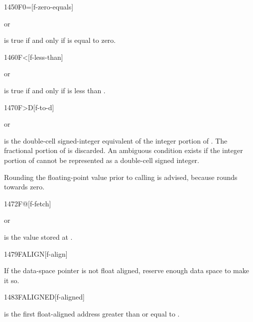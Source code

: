 \begin{worddef}{1450}{F0=}[f-zero-equals]
\item {}  or

	 is true if and only if  is equal to
	zero.
\end{worddef}


\begin{worddef}[Fless]{1460}{F<}[f-less-than]
\item {}  or

	 is true if and only if  is less than
	.
\end{worddef}


\begin{worddef}[FtoD]{1470}{F>D}[f-to-d]
\item {}  or

	 is the double-cell signed-integer equivalent of the
	integer portion of . The fractional portion of 
	is discarded. An ambiguous condition exists if the integer portion
	of  cannot be represented as a double-cell
	signed integer.

\note Rounding the floating-point value prior to calling 
	is advised, because  rounds towards zero.
\end{worddef}


\begin{worddef}{1472}{F@}[f-fetch]
\item {}  or

	 is the value stored at .
\end{worddef}


\begin{worddef}{1479}{FALIGN}[f-align]
\item \stack{}{}

	If the data-space pointer is not float aligned, reserve enough
	data space to make it so.
\end{worddef}


\begin{worddef}{1483}{FALIGNED}[f-aligned]
\item {}

	 is the first float-aligned address greater than
	or equal to .
\end{worddef}


